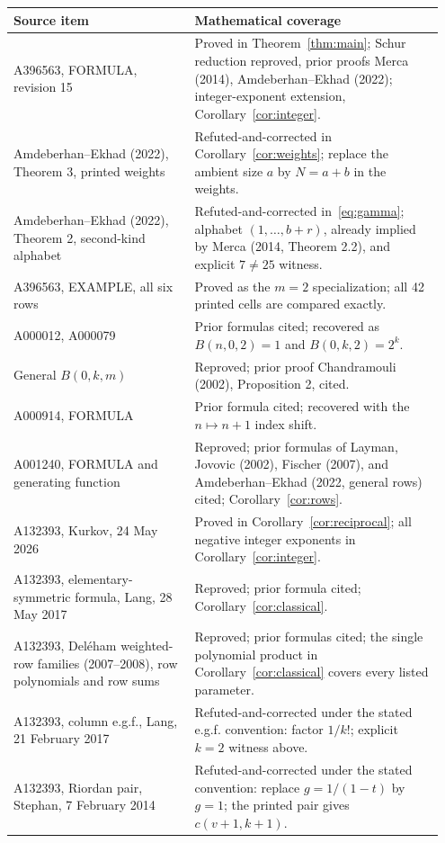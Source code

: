 \documentclass[11pt]{article}
\begin{document}
\begin{longtable}{@{}p{0.40\linewidth}p{0.55\linewidth}@{}}\toprule
Source item & Mathematical coverage \\\midrule\endhead
A396563, FORMULA, revision 15 & Proved in Theorem~\ref{thm:main}; Schur reduction reproved, prior proofs Merca (2014), Amdeberhan--Ekhad (2022); integer-exponent extension, Corollary~\ref{cor:integer}.\\
Amdeberhan--Ekhad (2022), Theorem 3, printed weights & Refuted-and-corrected in Corollary~\ref{cor:weights}; replace the ambient size $a$ by $N=a+b$ in the weights.\\
Amdeberhan--Ekhad (2022), Theorem 2, second-kind alphabet & Refuted-and-corrected in~\eqref{eq:gamma}; alphabet $(1,\ldots,b+r)$, already implied by Merca (2014, Theorem 2.2), and explicit $7\ne25$ witness.\\
A396563, EXAMPLE, all six rows & Proved as the $m=2$ specialization; all 42 printed cells are compared exactly.\\
A000012, A000079 & Prior formulas cited; recovered as $B(n,0,2)=1$ and $B(0,k,2)=2^k$.\\
General $B(0,k,m)$ & Reproved; prior proof Chandramouli (2002), Proposition 2, cited.\\
A000914, FORMULA & Prior formula cited; recovered with the $n\mapsto n+1$ index shift.\\
A001240, FORMULA and generating function & Reproved; prior formulas of Layman, Jovovic (2002), Fischer (2007), and Amdeberhan--Ekhad (2022, general rows) cited; Corollary~\ref{cor:rows}.\\
A132393, Kurkov, 24 May 2026 & Proved in Corollary~\ref{cor:reciprocal}; all negative integer exponents in Corollary~\ref{cor:integer}.\\
A132393, elementary-symmetric formula, Lang, 28 May 2017 & Reproved; prior formula cited; Corollary~\ref{cor:classical}.\\
A132393, Del\'eham weighted-row families (2007--2008), row polynomials and row sums & Reproved; prior formulas cited; the single polynomial product in Corollary~\ref{cor:classical} covers every listed parameter.\\
A132393, column e.g.f., Lang, 21 February 2017 & Refuted-and-corrected under the stated e.g.f. convention: factor $1/k!$; explicit $k=2$ witness above.\\
A132393, Riordan pair, Stephan, 7 February 2014 & Refuted-and-corrected under the stated convention: replace $g=1/(1-t)$ by $g=1$; the printed pair gives $c(v+1,k+1)$.\\

\end{longtable}
\end{document}
